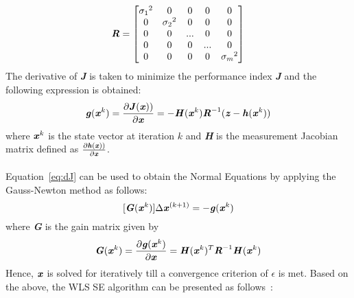 \documentclass[thesis.tex]{subfiles}
\begin{document}
\begin{equation}
\textbf{\textit{R}} = \begin{bmatrix}
{\sigma_{1}}^{2}& 0 & 0 & 0 & 0\\ 
0 & {\sigma_{2}}^{2} & 0 & 0 & 0\\ 
0 & 0 & ... & 0 & 0\\ 
0 & 0 & 0 & ... & 0\\ 
0 & 0 & 0 & 0 & {\sigma_{m}}^{2}
\end{bmatrix}
\end{equation}
The derivative of \textbf{\textit{J}} is taken to minimize the performance index \textbf{\textit{J}} and the following expression is obtained:
\begin{equation}\label{eq:dJ}
\textbf{\textit{g}}(\textbf{\textit{x}}^{k}) = \frac{\partial \textbf{\textit{J}}(\textbf{\textit{x}}))}{\partial \textbf{\textit{x}}} = -\textbf{\textit{H}}(\textbf{\textit{x}}^{k})\textbf{\textit{R}}^{-1}(\textbf{\textit{z}}-\textbf{\textit{h}}(\textbf{\textit{x}}^{k}))
\end{equation}
where $\textbf{\textit{x}}^{k}$ is the state vector at iteration $k$ and \textbf{\textit{H}} is the measurement Jacobian matrix defined as $\frac{\partial \textbf{\textit{h}}(\textbf{\textit{x}}))}{\partial \textbf{\textit{x}}}$.\\\\
Equation~\ref{eq:dJ}  can be used to obtain the Normal Equations by applying the Gauss-Newton method as follows:
\begin{equation}\label{eq:normaleq}
[\textbf{\textit{G}}(\textbf{\textit{x}}^{k})]\Delta \textbf{\textit{x}}^{(k+1)} = -\textbf{\textit{g}}(\textbf{\textit{x}}^{k})
\end{equation}
where \textbf{\textit{G}} is the gain matrix given by
\begin{equation}
\textbf{\textit{G}}(\textbf{\textit{x}}^{k}) = \frac{\partial \textbf{\textit{g}}(\textbf{\textit{x}}^{k})}{\partial \textbf{\textit{x}}} = \textbf{\textit{H}}(\textbf{\textit{x}}^{k})^{T} \textbf{\textit{R}}^{-1}\textbf{\textit{H}}(\textbf{\textit{x}}^{k})
\end{equation}
Hence, $\textbf{\textit{x}}$ is solved for iteratively till a convergence criterion of $\epsilon$ is met. Based on the above, the WLS SE algorithm can be presented as follows~\cite{Chen}:\\\\
\end{document}
